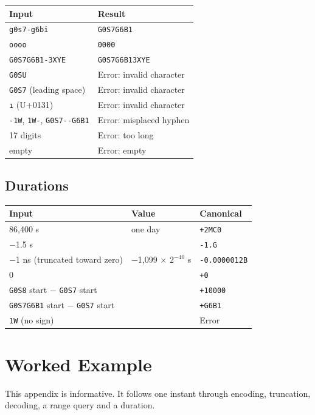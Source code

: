 \documentclass[11pt]{article}
\newcommand{\lit}[1]{\texttt{#1}}
\newcommand{\pow}[2]{\ensuremath{#1^{#2}}}
\begin{document}
\begin{center}
\begin{tabular}{@{}ll@{}}
\toprule
Input & Result \\
\midrule
\lit{g0s7-g6bi} & \lit{G0S7G6B1} \\
\lit{oooo} & \lit{0000} \\
\lit{G0S7G6B1-3XYE} & \lit{G0S7G6B13XYE} \\
\lit{G0SU} & Error: invalid character \\
\lit{\textvisiblespace G0S7} (leading space) & Error: invalid character \\
\lit{\i} (U+0131) & Error: invalid character \\
\lit{-1W}, \lit{1W-}, \lit{G0S7-{}-G6B1} & Error: misplaced hyphen \\
17 digits & Error: too long \\
empty & Error: empty \\
\bottomrule
\end{tabular}
\end{center}

\subsection{Durations}

\begin{center}
\begin{tabular}{@{}lll@{}}
\toprule
Input & Value & Canonical \\
\midrule
86,400 s & one day & \lit{+2MC0} \\
$-$1.5 s & & \lit{-1.G} \\
$-$1 ns (truncated toward zero) & $-$1,099 $\times$ \pow{2}{-40} s & \lit{-0.0000012B} \\
0 & & \lit{+0} \\
\lit{G0S8} start $-$ \lit{G0S7} start & & \lit{+10000} \\
\lit{G0S7G6B1} start $-$ \lit{G0S7} start & & \lit{+G6B1} \\
\lit{1W} (no sign) & & Error \\
\bottomrule
\end{tabular}
\end{center}

\section{Worked Example}\label{app:example}

This appendix is informative. It follows one instant through encoding,
truncation, decoding, a range query and a duration.
\end{document}
